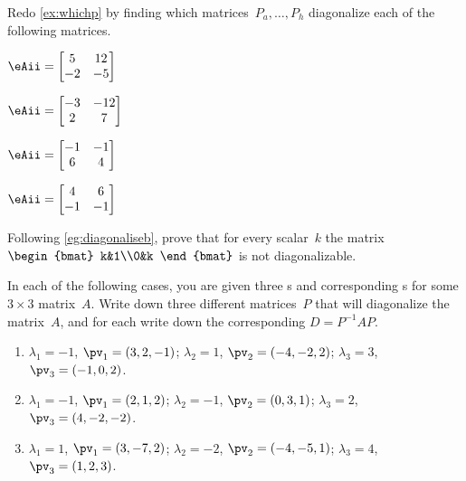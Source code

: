 \begin{exercise} \label{ex:whichps} 
Redo \autoref{ex:whichp} by finding which matrices~\(P_a,\ldots,P_h\) diagonalize each of the following matrices.
\begin{Parts}
\item \(\eAii=\begin{bmatrix} 5&12\\-2&-5 \end{bmatrix}\)
\item \(\eAii=\begin{bmatrix} -3&-12\\2&7 \end{bmatrix}\)
\item \(\eAii=\begin{bmatrix} -1&-1\\6&4 \end{bmatrix}\)
\item \(\eAii=\begin{bmatrix} 4&6\\-1&-1 \end{bmatrix}\)
\end{Parts}
\end{exercise}




\begin{exercise}  
Following \autoref{eg:diagonaliseb}, prove that for every scalar~\(k\) the matrix \(\begin{bmat} k&1\\0&k \end{bmat}\) is not diagonalizable.
\end{exercise}




\begin{exercise}  
In each of the following cases, you are given three  s and corresponding s for some \(3\times3\) matrix~\(A\).
Write down three different matrices~\(P\) that will diagonalize the matrix~\(A\), and for each write down the corresponding  \(D=P^{-1}AP\).
\begin{enumerate}
\item \(\lambda_1=-1\), \(\pv_1=(3,2,-1)\);
\(\lambda_2=1\), \(\pv_2=(-4,-2,2)\);
\(\lambda_3=3\), \(\pv_3=(-1,0,2)\).

\item \(\lambda_1=-1\), \(\pv_1=( 2,1,2)\);
\(\lambda_2=-1\), \(\pv_2=(0,3,1)\);
\(\lambda_3=2\), \(\pv_3=(4,-2,-2)\).

\item \(\lambda_1=1\), \(\pv_1=(3,-7,2)\);
\(\lambda_2=-2\), \(\pv_2=(-4,-5,1)\);
\(\lambda_3=4\), \(\pv_3=(1,2,3)\).


\end{enumerate}
\end{exercise}





